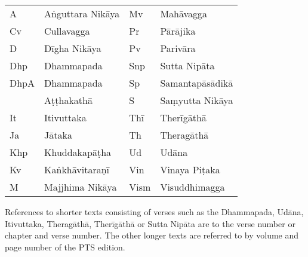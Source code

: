 \clearpage
\thispagestyle{empty}

{}
\bigskip

{\raggedright
\fontsize{9}{13}\selectfont

\begin{tabular}{@{}llll@{}}
  A    & Aṅguttara Nikāya & Mv   & Mahāvagga       \\
  Cv   & Cullavagga       & Pr   & Pārājika        \\
  D    & Dīgha Nikāya     & Pv   & Parivāra        \\
  Dhp  & Dhammapada       & Snp  & Sutta Nipāta    \\
  DhpA & Dhammapada       & Sp   & Samantapāsādikā \\
       & Aṭṭhakathā       & S    & Saṃyutta Nikāya \\
  It   & Itivuttaka       & Thī  & Therīgāthā      \\
  Ja   & Jātaka           & Th   & Theragāthā      \\
  Khp  & Khuddakapāṭha    & Ud   & Udāna           \\
  Kv   & Kaṅkhāvitaraṇī   & Vin  & Vinaya Piṭaka   \\
  M    & Majjhima Nikāya  & Vism & Visuddhimagga   \\
\end{tabular}

\bigskip

References to shorter texts consisting of verses such as the Dhammapada, Udāna,
Itivuttaka, Theragāthā, Therīgāthā or Sutta Nipāta are to the verse number or
chapter and verse number. The other longer texts are referred to by volume and
page number of the PTS edition.

}

